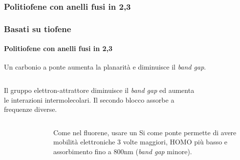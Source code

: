 \subsubsection{Politiofene con anelli fusi in 2,3}\begin{frame}\frametitle{Basati su tiofene}\framesubtitle{Politiofene con anelli fusi in 2,3}
Un carbonio a ponte aumenta la planarità e diminuisce il \emph{band gap}.\vspace{10pt}\begin{columns}
Il gruppo elettron-attrattore diminuisce il \emph{band gap} ed aumenta le interazioni intermolecolari. Il secondo blocco assorbe a frequenze diverse. 
\begin{figure}{}\end{figure}
\end{columns}
\begin{columns}\begin{figure}{}\end{figure}
Come nel fluorene, usare un Si come ponte permette di avere mobilità elettroniche 3 volte maggiori, HOMO più basso e assorbimento fino a 800nm (\emph{band gap} minore).
\end{columns}
\end{frame}



